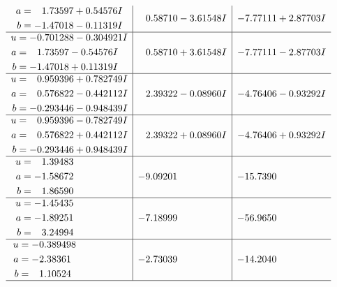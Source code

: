 \documentclass[1p]{elsarticle_modified}
\theoremstyle{definition}
\begin{document}
$$\begin{array}{c|c|c}
\begin{aligned}
a &= \phantom{-}1.73597 + 0.54576 I \\
b &= -1.47018 - 0.11319 I\end{aligned}
 & \phantom{-}0.58710 - 3.61548 I & -7.77111 + 2.87703 I \\ \hline\begin{aligned}
u &= -0.701288 - 0.304921 I \\
a &= \phantom{-}1.73597 - 0.54576 I \\
b &= -1.47018 + 0.11319 I\end{aligned}
 & \phantom{-}0.58710 + 3.61548 I & -7.77111 - 2.87703 I \\ \hline\begin{aligned}
u &= \phantom{-}0.959396 + 0.782749 I \\
a &= \phantom{-}0.576822 - 0.442112 I \\
b &= -0.293446 - 0.948439 I\end{aligned}
 & \phantom{-}2.39322 - 0.08960 I & -4.76406 - 0.93292 I \\ \hline\begin{aligned}
u &= \phantom{-}0.959396 - 0.782749 I \\
a &= \phantom{-}0.576822 + 0.442112 I \\
b &= -0.293446 + 0.948439 I\end{aligned}
 & \phantom{-}2.39322 + 0.08960 I & -4.76406 + 0.93292 I \\ \hline\begin{aligned}
u &= \phantom{-}1.39483\phantom{ +0.000000I} \\
a &= -1.58672\phantom{ +0.000000I} \\
b &= \phantom{-}1.86590\phantom{ +0.000000I}\end{aligned}
 & -9.09201\phantom{ +0.000000I} & -15.7390\phantom{ +0.000000I} \\ \hline\begin{aligned}
u &= -1.45435\phantom{ +0.000000I} \\
a &= -1.89251\phantom{ +0.000000I} \\
b &= \phantom{-}3.24994\phantom{ +0.000000I}\end{aligned}
 & -7.18999\phantom{ +0.000000I} & -56.9650\phantom{ +0.000000I} \\ \hline\begin{aligned}
u &= -0.389498\phantom{ +0.000000I} \\
a &= -2.38361\phantom{ +0.000000I} \\
b &= \phantom{-}1.10524\phantom{ +0.000000I}\end{aligned}
 & -2.73039\phantom{ +0.000000I} & -14.2040\phantom{ +0.000000I}\\
 \hline 
 \end{array}$$\newpage
\end{document}
